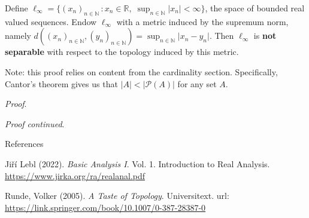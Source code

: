 \documentclass [aspectratio=169]{beamer}
\newcommand{\R}{{\mathbb{R}}}
\newcommand{\N}{{\mathbb{N}}}
\newcommand{\cP}{\mathcal{P}}
\begin{document}
\begin{frame}
\begin{example}
Define $\ell_\infty=\{ (x_n)_{n\in \N} \, : x_n \in \R , \; \sup_{n\in \N} \vert x_n \vert <\infty \}$, the space of bounded real valued sequences. Endow $\ell_\infty$ with a metric induced by the supremum norm, namely $d((x_n)_{n\in \N}, (y_n)_{n\in \N}) = \sup_{n\in \N} \vert x_n-y_n\vert$. 
Then $\ell_\infty$ is \textbf{not separable} with respect to the topology induced by this metric. 
\end{example}

\vspace{0.5em}
Note: this proof relies on content from the cardinality section. Specifically, Cantor's theorem gives us that $|A| < |\cP(A)|$ for any set $A$.

\vspace{0.5em}
\textit{Proof}.
\vspace{2.5cm}

\end{frame}


\begin{frame}
\textit{Proof continued}.
\vspace{7cm}

\end{frame}







\begin{frame}{References}

Ji\v{r}\'i Lebl (2022). \textit{Basic Analysis I}. Vol. 1. Introduction to Real Analysis.  \href{ https://www.jirka.org/ra/realanal.pdf}{https://www.jirka.org/ra/realanal.pdf} 

\vspace{1em}


Runde, Volker (2005). \textit{A Taste of Topology}. Universitext.  url:  \href{https://link.springer.com/book/10.1007/0-387-28387-0}{https://link.springer.com/book/10.1007/0-387-28387-0} 


\end{frame}
\end{document}
